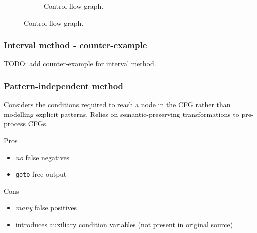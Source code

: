 \documentclass[aspectratio=1610]{beamer}
\begin{document}
\begin{frame}[noframenumbering]
\begin{figure}[htbp]
\begin{subfigure}[b]{0.50\textwidth}
			\caption{Control flow graph.}
		\end{subfigure}
	\end{figure}
\end{frame}

\begin{frame}
	\frametitle{Interval method - counter-example}

	TODO: add counter-example for interval method.

\end{frame}


\begin{frame}
	\frametitle{Pattern-independent method}

	Considers the conditions required to reach a node in the CFG rather than modelling explicit patterns. Relies on semantic-preserving transformations to pre-process CFGs.

	\vspace*{2em}

	\begin{block}{Pros}
		\begin{itemize}
			\item \textit{no} false negatives
			\item \texttt{goto}-free output
		\end{itemize}
	\end{block}

	\begin{block}{Cons}
		\begin{itemize}
			\item \textit{many} false positives
			\item introduces auxiliary condition variables (not present in original source)
		\end{itemize}
	\end{block}




\end{frame}
\end{document}
